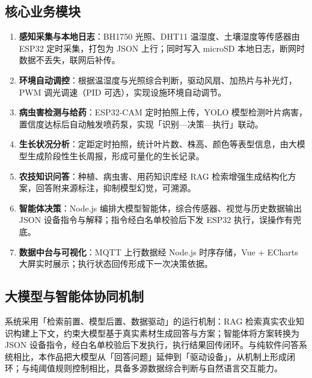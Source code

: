 ﻿\documentclass[11pt]{ctexart}
\begin{document}
\subsection{核心业务模块}
\begin{enumerate}
  \item \textbf{感知采集与本地日志}：BH1750 光照、DHT11 温湿度、土壤湿度等传感器由 ESP32 定时采集，打包为 JSON 上行；同时写入 microSD 本地日志，断网时数据不丢失，联网后补传。
  \item \textbf{环境自动调控}：根据温湿度与光照综合判断，驱动风扇、加热片与补光灯，PWM 调光调速（PID 可选），实现设施环境自动调节。
  \item \textbf{病虫害检测与给药}：ESP32-CAM 定时拍照上传，YOLO 模型检测叶片病害，置信度达标后自动触发喷药泵，实现「识别—决策—执行」联动。
  \item \textbf{生长状况分析}：定距定时拍照，统计叶片数、株高、颜色等表型信息，由大模型生成阶段性生长周报，形成可量化的生长记录。
  \item \textbf{农技知识问答}：种植、病虫害、用药知识库经 RAG 检索增强生成结构化方案，回答附来源标注，抑制模型幻觉，可溯源。
  \item \textbf{智能体决策}：Node.js 编排大模型智能体，综合传感器、视觉与历史数据输出 JSON 设备指令与解释；指令经白名单校验后下发 ESP32 执行，误操作有兜底。
  \item \textbf{数据中台与可视化}：MQTT 上行数据经 Node.js 时序存储，Vue + ECharts 大屏实时展示；执行状态回传形成下一次决策依据。
\end{enumerate}

\subsection{大模型与智能体协同机制}
系统采用「检索前置、模型后置、数据驱动」的运行机制：RAG 检索真实农业知识构建上下文，约束大模型基于真实素材生成回答与方案；智能体将方案转换为 JSON 设备指令，经白名单校验后下发执行，执行结果回传闭环。与纯软件问答系统相比，本作品把大模型从「回答问题」延伸到「驱动设备」，从机制上形成闭环；与纯阈值规则控制相比，具备多源数据综合判断与自然语言交互能力。
\end{document}
